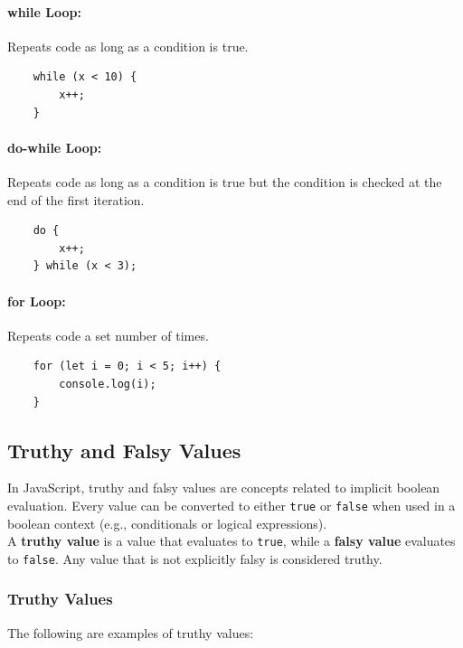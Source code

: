\documentclass{scrbook}
\begin{document}
\paragraph{while Loop:} Repeats code as long as a condition is true.

\begin{lstlisting}
    while (x < 10) {
        x++;
    }
\end{lstlisting}

\paragraph{do-while Loop:} Repeats code as long as a condition is true but the condition is checked at the end of the first iteration.

\begin{lstlisting}
    do {
        x++;
    } while (x < 3);
\end{lstlisting}

\paragraph{for Loop:} Repeats code a set number of times.

\begin{lstlisting}
    for (let i = 0; i < 5; i++) {
        console.log(i);
    }
\end{lstlisting}

\subsection{Truthy and Falsy Values}

In JavaScript, truthy and falsy values are concepts related to implicit boolean evaluation. Every value can be converted to either \texttt{true} or \texttt{false} when used in a boolean context (e.g., conditionals or logical expressions).\\

A \textbf{truthy value} is a value that evaluates to \texttt{true}, while a \textbf{falsy value} evaluates to \texttt{false}. Any value that is not explicitly falsy is considered truthy.

\subsubsection*{Truthy Values}

The following are examples of truthy values:
\end{document}
